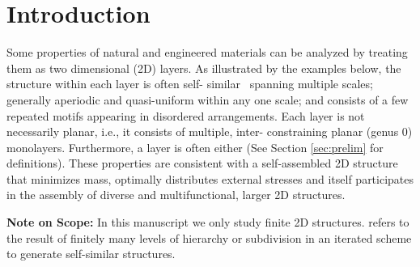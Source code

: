 \section{Introduction}
\label{sec:intro}

Some properties of natural and engineered materials can be analyzed by
treating them as two dimensional (2D) layers. As illustrated by the
examples below, the structure within each layer is often self-
similar~\cite{2012arXiv1204.6389G} spanning multiple scales; generally
aperiodic and quasi-uniform within any one scale; and consists of a
few repeated motifs appearing in disordered arrangements. Each layer
is not necessarily planar, i.e., it consists of multiple, inter-
constraining planar (genus 0) monolayers. Furthermore, a layer is
often  either  (See Section \ref{sec:prelim} for definitions). These
properties are consistent with a self-assembled 2D structure that
minimizes mass, optimally distributes external stresses and itself
participates in the assembly of diverse and multifunctional, larger 2D
structures.

\noindent
\textbf{Note on Scope:} In this manuscript we only study finite 2D structures.
 refers to the result of finitely many levels of hierarchy
or subdivision in an iterated scheme to generate self-similar structures.

